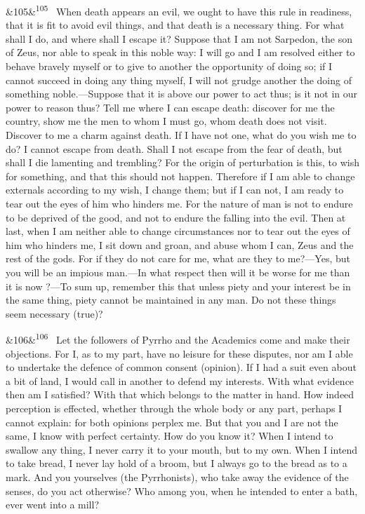 \documentclass[12pt]{article}
\newcommand{\para}[1][]{\par\noindent\ifx&#1&\else\textsuperscript{\footnotesize #1}~\fi}
\begin{document}
\para[105] When death appears an evil, we ought to have this rule in readiness, that it is fit to avoid evil things, and that death is a necessary thing. For what shall I do, and where shall I escape it? Suppose that I am not Sarpedon, the son of Zeus, nor able to speak in this noble way: I will go and I am resolved either to behave bravely myself or to give to another the opportunity of doing so; if I cannot succeed in doing any thing myself, I will not grudge another the doing of something noble.—Suppose that it is above our power to act thus; is it not in our power to reason thus? Tell me where I can escape death: discover for me the country, show me the men to whom I must go, whom death does not visit. Discover to me a charm against death. If I have not one, what do you wish me to do? I cannot escape from death. Shall I not escape from the fear of death, but shall I die lamenting and trembling? For the origin of perturbation is this, to wish for something, and that this should not happen. Therefore if I am able to change externals according to my wish, I change them; but if I can not, I am ready to tear out the eyes of him who hinders me. For the nature of man is not to endure to be deprived of the good, and not to endure the falling into the evil. Then at last, when I am neither able to change circumstances nor to tear out the eyes of him who hinders me, I sit down and groan, and abuse whom I can, Zeus and the rest of the gods. For if they do not care for me, what are they to me?—Yes, but you will be an impious man.—In what respect then will it be worse for me than it is now ?—To sum up, remember this that unless piety and your interest be in the same thing, piety cannot be maintained in any man. Do not these things seem necessary (true)?

\para[106] Let the followers of Pyrrho and the Academics come and make their objections. For I, as to my part, have no leisure for these disputes, nor am I able to undertake the defence of common consent (opinion). If I had a suit even about a bit of land, I would call in another to defend my interests. With what evidence then am I satisfied? With that which belongs to the matter in hand. How indeed perception is effected, whether through the whole body or any part, perhaps I cannot explain: for both opinions perplex me. But that you and I are not the same, I know with perfect certainty. How do you know it? When I intend to swallow any thing, I never carry it to your mouth, but to my own. When I intend to take bread, I never lay hold of a broom, but I always go to the bread as to a mark. And you yourselves (the Pyrrhonists), who take away the evidence of the senses, do you act otherwise? Who among you, when he intended to enter a bath, ever went into a mill?
\end{document}
